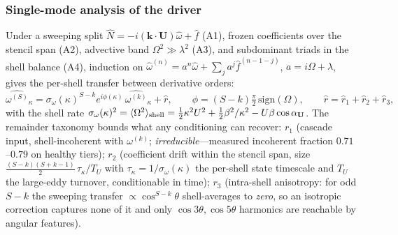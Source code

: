 \documentclass[11pt]{article}
\theoremstyle{plain}
\theoremstyle{definition}
\begin{document}
\subsubsection{Single-mode analysis of the driver}
Under a sweeping split $\hat N=-i(\mathbf k\cdot\mathbf U)\hat\omega+\hat f$
(A1), frozen coefficients over the stencil span (A2), advective band
$\Omega^2\gg\lambda^2$ (A3), and subdominant triads in the shell balance (A4),
induction on $\hat\omega^{(n)}=a^n\hat\omega+\sum_ja^j\hat f^{(n-1-j)}$,
$a=i\Omega+\lambda$, gives the per-shell transfer between derivative orders:
\begin{equation}
\widehat{\omega^{(S)}}_\kappa
=\sigma_\omega(\kappa)^{S-k}e^{i\phi(\kappa)}\,\widehat{\omega^{(k)}}_\kappa
+\hat r,\qquad
\phi=(S-k)\tfrac\pi2\,\mathrm{sign}(\Omega),\qquad
\hat r=\hat r_1+\hat r_2+\hat r_3,
\label{eq:transfer}
\end{equation}
with the shell rate
$\sigma_\omega(\kappa)^2=\langle\Omega^2\rangle_{\rm shell}
=\tfrac12\kappa^2U^2+\tfrac12\beta^2/\kappa^2-U\beta\cos\alpha_{\mathbf U}$.
The remainder taxonomy bounds what any conditioning can recover:
$r_1$ (cascade input, shell-incoherent with $\omega^{(k)}$;
\emph{irreducible}---measured incoherent fraction $0.71$--$0.79$ on healthy
tiers); $r_2$ (coefficient drift within the stencil span, size
$\tfrac{(S-k)(S+k-1)}2\,\tau_\kappa/T_U$ with $\tau_\kappa=1/\sigma_\omega(\kappa)$
the per-shell state timescale and $T_U$ the large-eddy turnover, conditionable
in time); $r_3$ (intra-shell
anisotropy: for odd $S-k$ the sweeping transfer $\propto\cos^{S-k}\theta$
shell-averages to \emph{zero}, so an isotropic correction captures none of it
and only $\cos3\theta,\cos5\theta$ harmonics are reachable by angular
features).
\end{document}
